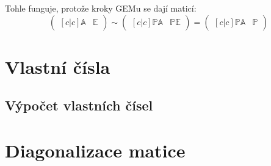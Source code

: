 \documentclass{szzclass}
\begin{document}
Tohle funguje, protože kroky GEMu se dají  maticí:
\begin{equation}
\begin{pmatrix}[c|c]
\mathbb{A} & \mathbb{E}
\end{pmatrix} \sim
\begin{pmatrix}[c|c]
\mathbb{P}\mathbb{A} & \mathbb{P}\mathbb{E}
\end{pmatrix} =
\begin{pmatrix}[c|c]
\mathbb{P}\mathbb{A} & \mathbb{P}
\end{pmatrix}
\end{equation}

\section{Vlastní čísla}
\subsection{Výpočet vlastních čísel}
\section{Diagonalizace matice}
\end{document}

